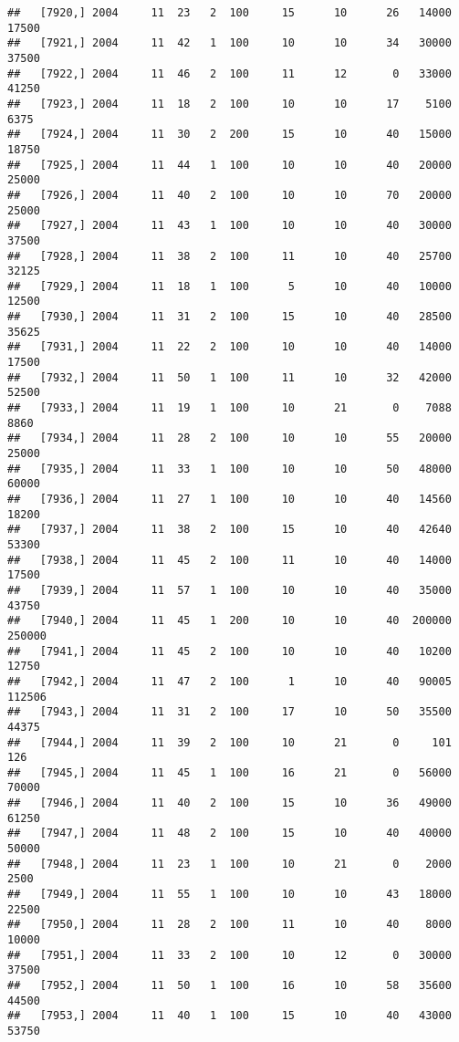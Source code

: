 \documentclass{article}\usepackage[]{graphicx}\usepackage[]{color}
\makeatletter
\newenvironment{kframe}{%
 \def\at@end@of@kframe{}%
 \ifinner\ifhmode%
  \def\at@end@of@kframe{\end{minipage}}%
  \begin{minipage}{\columnwidth}%
 \fi\fi%
 \def\FrameCommand##1{\hskip\@totalleftmargin \hskip-\fboxsep
 \colorbox{shadecolor}{##1}\hskip-\fboxsep
     \hskip-\linewidth \hskip-\@totalleftmargin \hskip\columnwidth}%
 \MakeFramed {\advance\hsize-\width
   \@totalleftmargin\z@ \linewidth\hsize
   \@setminipage}}%
 {\par\unskip\endMakeFramed%
 \at@end@of@kframe}
\newenvironment{knitrout}{}{} %
\makeatother
\begin{document}
\begin{knitrout}
\begin{kframe}
\begin{verbatim}
##   [7920,] 2004     11  23   2  100     15      10      26   14000   17500
##   [7921,] 2004     11  42   1  100     10      10      34   30000   37500
##   [7922,] 2004     11  46   2  100     11      12       0   33000   41250
##   [7923,] 2004     11  18   2  100     10      10      17    5100    6375
##   [7924,] 2004     11  30   2  200     15      10      40   15000   18750
##   [7925,] 2004     11  44   1  100     10      10      40   20000   25000
##   [7926,] 2004     11  40   2  100     10      10      70   20000   25000
##   [7927,] 2004     11  43   1  100     10      10      40   30000   37500
##   [7928,] 2004     11  38   2  100     11      10      40   25700   32125
##   [7929,] 2004     11  18   1  100      5      10      40   10000   12500
##   [7930,] 2004     11  31   2  100     15      10      40   28500   35625
##   [7931,] 2004     11  22   2  100     10      10      40   14000   17500
##   [7932,] 2004     11  50   1  100     11      10      32   42000   52500
##   [7933,] 2004     11  19   1  100     10      21       0    7088    8860
##   [7934,] 2004     11  28   2  100     10      10      55   20000   25000
##   [7935,] 2004     11  33   1  100     10      10      50   48000   60000
##   [7936,] 2004     11  27   1  100     10      10      40   14560   18200
##   [7937,] 2004     11  38   2  100     15      10      40   42640   53300
##   [7938,] 2004     11  45   2  100     11      10      40   14000   17500
##   [7939,] 2004     11  57   1  100     10      10      40   35000   43750
##   [7940,] 2004     11  45   1  200     10      10      40  200000  250000
##   [7941,] 2004     11  45   2  100     10      10      40   10200   12750
##   [7942,] 2004     11  47   2  100      1      10      40   90005  112506
##   [7943,] 2004     11  31   2  100     17      10      50   35500   44375
##   [7944,] 2004     11  39   2  100     10      21       0     101     126
##   [7945,] 2004     11  45   1  100     16      21       0   56000   70000
##   [7946,] 2004     11  40   2  100     15      10      36   49000   61250
##   [7947,] 2004     11  48   2  100     15      10      40   40000   50000
##   [7948,] 2004     11  23   1  100     10      21       0    2000    2500
##   [7949,] 2004     11  55   1  100     10      10      43   18000   22500
##   [7950,] 2004     11  28   2  100     11      10      40    8000   10000
##   [7951,] 2004     11  33   2  100     10      12       0   30000   37500
##   [7952,] 2004     11  50   1  100     16      10      58   35600   44500
##   [7953,] 2004     11  40   1  100     15      10      40   43000   53750

\end{verbatim}
\end{kframe}
\end{knitrout}
\end{document}
